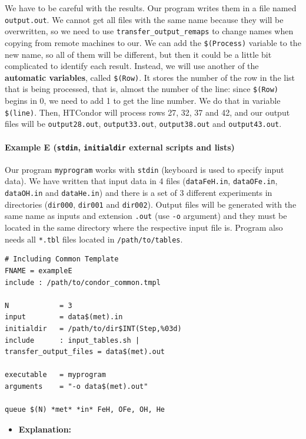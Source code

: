 \documentclass[a4paper,10pt]{article}
\begin{document}
We have to be careful with the results. Our program writes them in a file named
\texttt{output.out}. We cannot get all files with the same name because they will be
overwritten, so we need to use \texttt{transfer\_output\_remaps} to change names when
copying from remote machines to our. We can add the \texttt{\$(Process)} variable to the
new name, so all of them will be different, but then it could be a little bit
complicated to identify each result. Instead, we will use another of the
\textbf{automatic variables}, called \texttt{\$(Row)}. It stores the number of the row in the
list that is being processed, that is, almost the number of the line: since
\texttt{\$(Row)} begins in 0, we need to add 1 to get the line number. We do that in
variable \texttt{\$(line)}. Then, HTCondor will process rows 27, 32, 37 and 42, and our
output files will be \texttt{output28.out}, \texttt{output33.out}, \texttt{output38.out} and
\texttt{output43.out}.

\paragraph{Example E (\texttt{stdin}, \texttt{initialdir} external scripts and lists)}
\label{sec:orgd9a7184}

Our program \texttt{myprogram} works with \texttt{stdin} (keyboard is used to specify input
data). We have written that input data in 4 files (\texttt{dataFeH.in}, \texttt{dataOFe.in},
\texttt{dataOH.in} and \texttt{dataHe.in}) and there is a set of 3 different experiments in
directories (\texttt{dir000}, \texttt{dir001} and \texttt{dir002}). Output files will be generated
with the same name as inputs and extension \texttt{.out} (use \texttt{-o} argument) and they
must be located in the same directory where the respective input file
is. Program also needs all \texttt{*.tbl} files located in \texttt{/path/to/tables}.

\begin{verbatim}
# Including Common Template
FNAME = exampleE
include : /path/to/condor_common.tmpl

N            = 3
input        = data$(met).in
initialdir   = /path/to/dir$INT(Step,%03d)
include      : input_tables.sh |
transfer_output_files = data$(met).out

executable   = myprogram
arguments    = "-o data$(met).out"

queue $(N) *met* *in* FeH, OFe, OH, He
\end{verbatim}

\begin{itemize}
\item \textbf{Explanation:}
\end{itemize}
\end{document}
